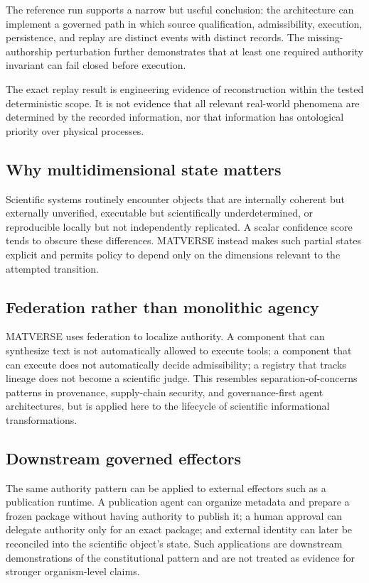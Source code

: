 \documentclass[11pt]{article}
\begin{document}
The reference run supports a narrow but useful conclusion: the architecture can implement a governed path in which source qualification, admissibility, execution, persistence, and replay are distinct events with distinct records. The missing-authorship perturbation further demonstrates that at least one required authority invariant can fail closed before execution.

The exact replay result is engineering evidence of reconstruction within the tested deterministic scope. It is not evidence that all relevant real-world phenomena are determined by the recorded information, nor that information has ontological priority over physical processes.

\subsection{Why multidimensional state matters}

Scientific systems routinely encounter objects that are internally coherent but externally unverified, executable but scientifically underdetermined, or reproducible locally but not independently replicated. A scalar confidence score tends to obscure these differences. MATVERSE instead makes such partial states explicit and permits policy to depend only on the dimensions relevant to the attempted transition.

\subsection{Federation rather than monolithic agency}

MATVERSE uses federation to localize authority. A component that can synthesize text is not automatically allowed to execute tools; a component that can execute does not automatically decide admissibility; a registry that tracks lineage does not become a scientific judge. This resembles separation-of-concerns patterns in provenance, supply-chain security, and governance-first agent architectures, but is applied here to the lifecycle of scientific informational transformations.

\subsection{Downstream governed effectors}

The same authority pattern can be applied to external effectors such as a publication runtime. A publication agent can organize metadata and prepare a frozen package without having authority to publish it; a human approval can delegate authority only for an exact package; and external identity can later be reconciled into the scientific object's state. Such applications are downstream demonstrations of the constitutional pattern and are not treated as evidence for stronger organism-level claims.
\end{document}
